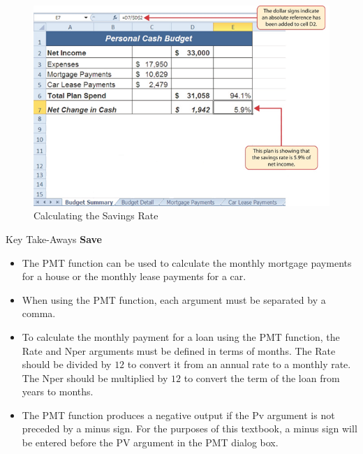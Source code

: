 \begin{figure}[H]
	\centering
	\includegraphics[width=\maxwidth{.95\linewidth}]{gfx/ch02_fig39}
	\caption{Calculating the Savings Rate}
	\label{02:fig39}
\end{figure}

\begin{center}
	\begin{tkwbox}{Key Take-Aways}
		\textbf{Save}
		\\
		\begin{itemize}
			\setlength{\itemsep}{0pt}
			\setlength{\parskip}{0pt}
			\setlength{\parsep}{0pt}
			
			\item The PMT function can be used to calculate the monthly mortgage payments for a house or the monthly lease payments for a car.
			\item When using the PMT function, each argument must be separated by a comma.
			\item To calculate the monthly payment for a loan using the PMT function, the Rate and Nper arguments must be defined in terms of months. The Rate should be divided by $ 12 $ to convert it from an annual rate to a monthly rate. The Nper should be multiplied by $ 12 $ to convert the term of the loan from years to months.
			\item The PMT function produces a negative output if the Pv argument is not preceded by a minus sign. For the purposes of this textbook, a minus sign will be entered before the PV argument in the PMT dialog box.
			
		\end{itemize}
	\end{tkwbox}
\end{center}

